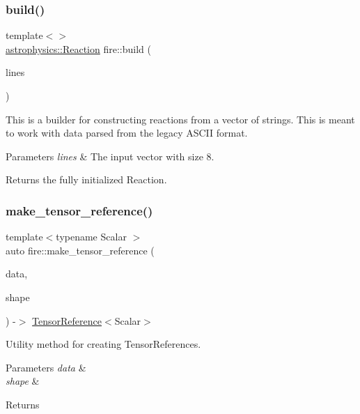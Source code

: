 \subsubsection{\texorpdfstring{build()}{build()}\hspace{0.1cm}{\footnotesize\ttfamily [6/6]}}
{\footnotesize\ttfamily template$<$$>$ \\
\hyperlink{a01251}{astrophysics\+::\+Reaction} fire\+::build (\begin{DoxyParamCaption}\item[{const vector$<$ string $>$ \&}]{lines }\end{DoxyParamCaption})}

This is a builder for constructing reactions from a vector of strings. This is meant to work with data parsed from the legacy A\+S\+C\+II format. 
\begin{DoxyParams}{Parameters}
{\em lines} & The input vector with size 8. \\
\hline
\end{DoxyParams}
\begin{DoxyReturn}{Returns}
the fully initialized Reaction. 
\end{DoxyReturn}
\mbox{\label{a00521_aaab26473f8b0cb78cff67ae06ff7ce80}} 
\subsubsection{\texorpdfstring{make\+\_\+tensor\+\_\+reference()}{make\_tensor\_reference()}}
{\footnotesize\ttfamily template$<$typename Scalar $>$ \\
auto fire\+::make\+\_\+tensor\+\_\+reference (\begin{DoxyParamCaption}\item[{Scalar $\ast$}]{data,  }\item[{\hyperlink{a01359}{Tensor\+Shape} \&}]{shape }\end{DoxyParamCaption}) -\/$>$ \hyperlink{a00521_a1bf491fd1c876e2808648b2fd291e3dd}{Tensor\+Reference}$<$Scalar$>$ }

Utility method for creating Tensor\+References.


\begin{DoxyParams}{Parameters}
{\em data} & \\
\hline
{\em shape} & \\
\hline
\end{DoxyParams}
\begin{DoxyReturn}{Returns}

\end{DoxyReturn}
\mbox{\label{a00521_a2b47cfd8a5d8711cdc55e1397487b90b}} 
